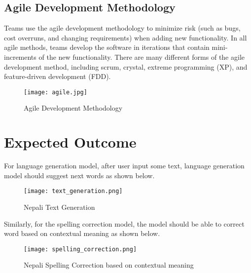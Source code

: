 \subsection{Agile Development Methodology}
Teams use the agile development methodology to minimize risk (such as bugs, cost overruns, and changing requirements) when adding new functionality. In all agile methods, teams develop the software in iterations that contain mini-increments of the new functionality. There are many different forms of the agile development method, including scrum, crystal, extreme programming (XP), and feature-driven development (FDD).

\begin{figure}[H]
    \centering
    \texttt{[image: agile.jpg]}
    \caption{Agile Development Methodology}
    \label{fig:Agile Development Methodology}
\end{figure}

\section{Expected Outcome}
For language generation model, after user input some text, language generation model should suggest next words as shown below.

\begin{figure}[H]
    \centering
    \texttt{[image: text\_generation.png]}
    \caption{Nepali Text Generation}
    \label{fig:Nepali Text Generation}
\end{figure}

Similarly, for the spelling correction model, the model should be able to correct word based on contextual meaning as shown below.

\begin{figure}[H]
    \centering
    \texttt{[image: spelling\_correction.png]}
    \caption{Nepali Spelling Correction based on contextual meaning}
    \label{fig:Nepali Spelling Correction}
\end{figure}